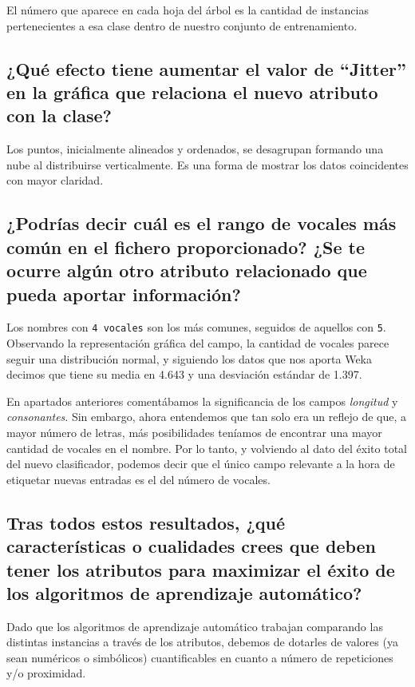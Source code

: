 \documentclass[12pt]{article}
\begin{document}
El número que aparece en cada hoja del árbol es la cantidad de instancias pertenecientes a esa clase dentro de nuestro conjunto de entrenamiento.

\subsection*{\small ¿Qué efecto tiene aumentar el valor de ``Jitter'' en la gráfica que relaciona el nuevo atributo con la clase?}

Los puntos, inicialmente alineados y ordenados, se desagrupan formando una nube al distribuirse verticalmente. Es una forma de mostrar los datos coincidentes con mayor claridad.

\subsection*{\small ¿Podrías decir cuál es el rango de vocales más común en el fichero proporcionado? ¿Se te ocurre algún otro atributo relacionado que pueda aportar información?}

Los nombres con \texttt{4 vocales} son los más comunes, seguidos de aquellos con \texttt{5}. Observando la representación gráfica del campo, la cantidad de vocales parece seguir una distribución normal, y siguiendo los datos que nos aporta Weka decimos que tiene su media en 4.643 y una desviación estándar de 1.397.

En apartados anteriores comentábamos la significancia de los campos \emph{longitud} y \emph{consonantes}. Sin embargo, ahora entendemos que tan solo era un reflejo de que, a mayor número de letras, más posibilidades teníamos de encontrar una mayor cantidad de vocales en el nombre. Por lo tanto, y volviendo al dato del éxito total del nuevo clasificador, podemos decir que el único campo relevante a la hora de etiquetar nuevas entradas es el del número de vocales.

\subsection*{\small Tras todos estos resultados, ¿qué características o cualidades crees que deben tener los atributos para maximizar el éxito de los algoritmos de aprendizaje automático?}

Dado que los algoritmos de aprendizaje automático trabajan comparando las distintas instancias a través de los atributos, debemos de dotarles de valores (ya sean numéricos o simbólicos) cuantificables en cuanto a número de repeticiones y/o proximidad.
\end{document}
